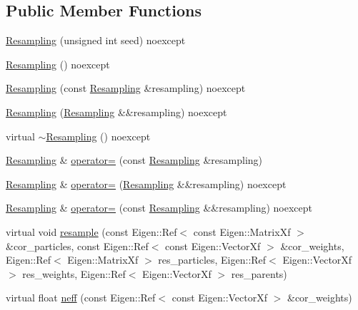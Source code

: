 \subsection*{Public Member Functions}
\begin{DoxyCompactItemize}
\item 
\mbox{\hyperlink{classbfl_1_1Resampling_a22472d13211e8384eb56e0a16cbef63c}{Resampling}} (unsigned int seed) noexcept
\item 
\mbox{\hyperlink{classbfl_1_1Resampling_a817b9424651d6e54c5237feed607d530}{Resampling}} () noexcept
\item 
\mbox{\hyperlink{classbfl_1_1Resampling_ab8b3061b26141dc7630fa2481e63c27b}{Resampling}} (const \mbox{\hyperlink{classbfl_1_1Resampling}{Resampling}} \&resampling) noexcept
\item 
\mbox{\hyperlink{classbfl_1_1Resampling_af49062fae532a36662703905ad1cffca}{Resampling}} (\mbox{\hyperlink{classbfl_1_1Resampling}{Resampling}} \&\&resampling) noexcept
\item 
virtual \mbox{\hyperlink{classbfl_1_1Resampling_a2a11fe3c1ae79137d6bf4bc6a5171083}{$\sim$\+Resampling}} () noexcept
\item 
\mbox{\hyperlink{classbfl_1_1Resampling}{Resampling}} \& \mbox{\hyperlink{classbfl_1_1Resampling_a139238a96264afe71858445d8f2c137a}{operator=}} (const \mbox{\hyperlink{classbfl_1_1Resampling}{Resampling}} \&resampling)
\item 
\mbox{\hyperlink{classbfl_1_1Resampling}{Resampling}} \& \mbox{\hyperlink{classbfl_1_1Resampling_a2c90a9a0705770bad5761a04fefe6eaa}{operator=}} (\mbox{\hyperlink{classbfl_1_1Resampling}{Resampling}} \&\&resampling) noexcept
\item 
\mbox{\hyperlink{classbfl_1_1Resampling}{Resampling}} \& \mbox{\hyperlink{classbfl_1_1Resampling_a2120e8c5d26276cd3432ac23a2ada859}{operator=}} (const \mbox{\hyperlink{classbfl_1_1Resampling}{Resampling}} \&\&resampling) noexcept
\item 
virtual void \mbox{\hyperlink{classbfl_1_1Resampling_a6b5a246250f1d193b3316c10bdc689f6}{resample}} (const Eigen\+::\+Ref$<$ const Eigen\+::\+Matrix\+Xf $>$ \&cor\+\_\+particles, const Eigen\+::\+Ref$<$ const Eigen\+::\+Vector\+Xf $>$ \&cor\+\_\+weights, Eigen\+::\+Ref$<$ Eigen\+::\+Matrix\+Xf $>$ res\+\_\+particles, Eigen\+::\+Ref$<$ Eigen\+::\+Vector\+Xf $>$ res\+\_\+weights, Eigen\+::\+Ref$<$ Eigen\+::\+Vector\+Xf $>$ res\+\_\+parents)
\item 
virtual float \mbox{\hyperlink{classbfl_1_1Resampling_aacbdbcf3f6c8620785ed6446928cd1f1}{neff}} (const Eigen\+::\+Ref$<$ const Eigen\+::\+Vector\+Xf $>$ \&cor\+\_\+weights)
\end{DoxyCompactItemize}
